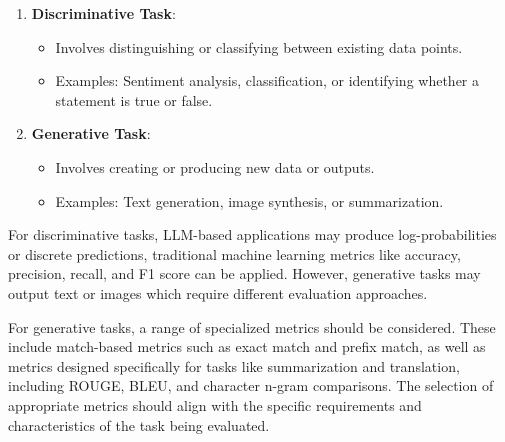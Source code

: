 \begin{enumerate}
    \item \textbf{Discriminative Task}:
    \begin{itemize}
        \item Involves distinguishing or classifying between existing data points.
        \item Examples: Sentiment analysis, classification, or identifying whether a statement is true or false.
    \end{itemize}
    
    \item \textbf{Generative Task}:
    \begin{itemize}
        \item Involves creating or producing new data or outputs.
        \item Examples: Text generation, image synthesis, or summarization.
    \end{itemize}
\end{enumerate}
For discriminative tasks, LLM-based applications may produce log-probabilities or discrete predictions, traditional machine learning metrics like accuracy, precision, recall, and F1 score can be applied. However, generative tasks may output text or images which require different evaluation approaches.

For generative tasks, a range of specialized metrics should be considered. These include match-based metrics such as exact match and prefix match, as well as metrics designed specifically for tasks like summarization and translation, including ROUGE, BLEU, and character n-gram comparisons. The selection of appropriate metrics should align with the specific requirements and characteristics of the task being evaluated.


